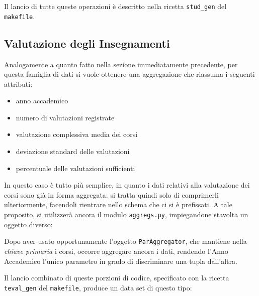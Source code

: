 		\vspace{0.3cm}

		Il lancio di tutte queste operazioni è descritto nella ricetta \texttt{stud\_gen} del \texttt{makefile}.

	\subsection{Valutazione degli Insegnamenti}

		Analogamente a quanto fatto nella sezione immediatamente precedente, per questa famiglia di dati si vuole ottenere una aggregazione che riassuma i seguenti attributi:

		\begin{itemize}
			\item anno accademico
			\item numero di valutazioni registrate
			\item valutazione complessiva media dei corsi
			\item deviazione standard delle valutazioni
			\item percentuale delle valutazioni sufficienti
		\end{itemize}

		In questo caso è tutto più semplice, in quanto i dati relativi alla valutazione dei corsi sono già in forma aggregata: si tratta quindi solo di comprimerli ulteriormente, facendoli rientrare nello schema che ci si è prefissati. A tale proposito, si utilizzerà ancora il modulo \texttt{aggregs.py}, impiegandone stavolta un oggetto diverso:

		

		\vspace{0.3cm}

		Dopo aver usato opportunamente l'oggetto \texttt{ParAggregator}, che mantiene nella \textit{chiave primaria} i corsi, occorre aggregare ancora i dati, rendendo l'Anno Accademico l'unico parametro in grado di discriminare una tupla dall'altra.

		

		\vspace{0.3cm}

		Il lancio combinato di queste porzioni di codice, specificato con la ricetta \texttt{teval\_gen} del \texttt{makefile}, produce un data set di questo tipo:\\

